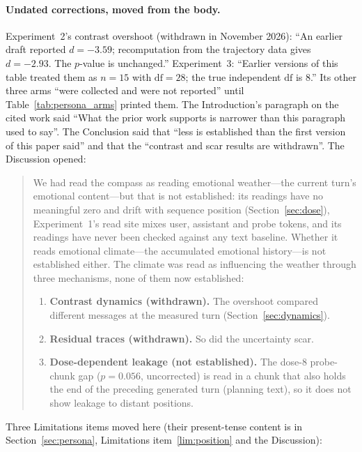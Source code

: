 \documentclass[11pt,a4paper]{article}
\begin{document}
\paragraph{Undated corrections, moved from the body.} Experiment~2's
contrast overshoot (withdrawn in November 2026): ``An earlier draft reported $d{=}-3.59$;
recomputation from the trajectory data gives $d{=}-2.93$. The $p$-value
is unchanged.'' Experiment~3: ``Earlier versions of this table treated
them as $n{=}15$ with $\mathrm{df}{=}28$; the true independent
$\mathrm{df}$ is 8.'' Its other three arms ``were collected and were not
reported'' until Table~\ref{tab:persona_arms} printed them. The
Introduction's paragraph on the cited work said ``What the prior work
supports is narrower than this paragraph used to say''. The Conclusion
said that ``less is established than the first version of this paper
said'' and that the ``contrast and scar results are withdrawn''. The
Discussion opened:
\begin{quote}\small\sloppy
We had read the compass as reading emotional weather---the current
turn's emotional content---but that is not established: its readings have no
meaningful zero and drift with sequence position (Section~\ref{sec:dose}),
Experiment~1's read site mixes user, assistant and probe tokens, and its
readings have never been checked against any text baseline. Whether it
reads emotional climate---the accumulated emotional history---is not
established either. The climate was
read as influencing the weather through three mechanisms, none of them
now established:
\begin{enumerate}[nosep]
    \item \textbf{Contrast dynamics (withdrawn).} The overshoot compared
          different messages at the measured turn
          (Section~\ref{sec:dynamics}).
    \item \textbf{Residual traces (withdrawn).} So did the uncertainty
          scar.
    \item \textbf{Dose-dependent leakage (not established).} The
          dose-8 probe-chunk gap ($p{=}0.056$, uncorrected) is read in a
          chunk that also holds the end of the preceding generated turn
          (planning text), so it does not show leakage to distant positions.
\end{enumerate}
\end{quote}
Three Limitations items moved here (their present-tense content is in
Section~\ref{sec:persona}, Limitations item~\ref{lim:position} and the Discussion):
\end{document}
